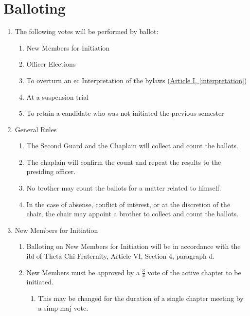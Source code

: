 \section{Balloting}
\label{balloting}
	\begin{enumerate}
		\item The following votes will be performed by ballot:
			\begin{enumerate}
				\item New Members for Initiation 
				\item Officer Elections 
				\item To overturn an \gls{ec} Interpretation of the bylaws (\hyperref[interpretation]{Article I, \autoref*{interpretation}}) 
				\item At a suspension trial
                \item To retain a candidate who was not initiated the previous semester
			\end{enumerate}

		\item General Rules
		\begin{enumerate}

			\item The Second Guard and the Chaplain will collect and count the ballots.

			\item The chaplain will confirm the count and repeat the results to the presiding officer.

            \item No brother may count the ballots for a matter related to himself.

            \item In the case of absense, conflict of interest, or at the discretion of the chair, the chair may appoint a brother to collect and count the ballots.

		\end{enumerate}

		\item New Members for Initiation
		\begin{enumerate}
			\item Balloting on New Members for Initiation will be in accordance with the \gls{ibl} of Theta Chi Fraternity, Article VI, Section 4, paragraph d.

			\item New Members must be approved by a $\frac{3}{4}$ vote of the active chapter to be initiated.
            \begin{enumerate}
                \item This may be changed for the duration of a single chapter meeting by a \gls{simp-maj} vote.
            \end{enumerate}
		\end{enumerate}


\end{enumerate}
